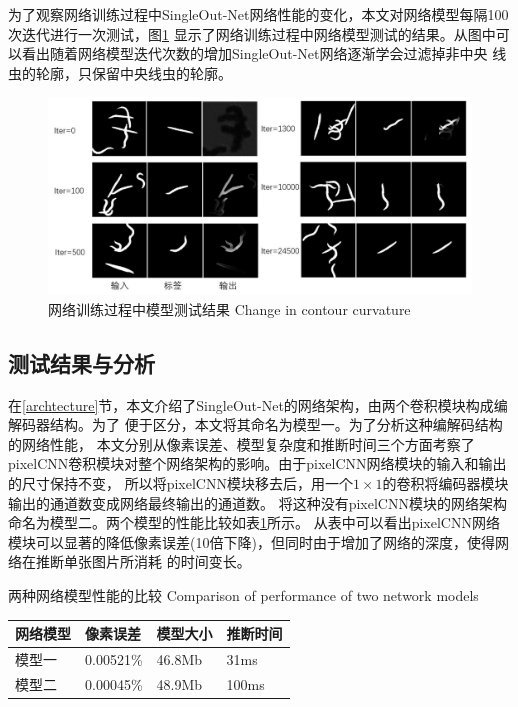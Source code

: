 	
	为了观察网络训练过程中SingleOut-Net网络性能的变化，本文对网络模型每隔100次迭代进行一次测试，图\ref{fig:chap4:progress}
	显示了网络训练过程中网络模型测试的结果。从图中可以看出随着网络模型迭代次数的增加SingleOut-Net网络逐渐学会过滤掉非中央
	线虫的轮廓，只保留中央线虫的轮廓。
		\begin{figure}[htb]
	  \centering
	  \includegraphics[width=15cm]{figure/chap4/progress.jpg}
	  \bicaption
		{网络训练过程中模型测试结果}
		{Change in contour curvature}
	  \label{fig:chap4:progress}
	\end{figure}
\subsection{测试结果与分析}
	 在\ref{archtecture}节，本文介绍了SingleOut-Net的网络架构，由两个卷积模块构成编解码器结构。为了
	 便于区分，本文将其命名为模型一。为了分析这种编解码结构的网络性能，
	 本文分别从像素误差、模型复杂度和推断时间三个方面考察了
	 pixelCNN卷积模块对整个网络架构的影响。由于pixelCNN网络模块的输入和输出的尺寸保持不变，
	 所以将pixelCNN模块移去后，用一个$1\times1$的卷积将编码器模块输出的通道数变成网络最终输出的通道数。
	 将这种没有pixelCNN模块的网络架构命名为模型二。两个模型的性能比较如表\ref{tab:performance}所示。
	 从表中可以看出pixelCNN网络模块可以显著的降低像素误差(10倍下降)，但同时由于增加了网络的深度，使得网络在推断单张图片所消耗
	 的时间变长。
\begin{table}[!hpb]
	\centering
	\bicaption
    {两种网络模型性能的比较}
    {Comparison of performance of two network models}
	\label{tab:performance}
	\begin{tabular}{p{75pt}p{75pt}p{75pt}p{75pt}}
	\toprule
	网络模型 & 像素误差 & 模型大小 & 推断时间 \\
	\midrule
	模型一 &  0.00521\% & 46.8Mb & 31ms \\
	模型二 & 0.00045\% & 48.9Mb & 100ms \\
	\bottomrule
\end{tabular}
\end{table}
